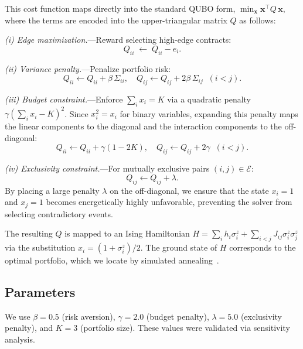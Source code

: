 \documentclass[aps, reprint, prl, twocolumn, superscriptaddress,amsmath,amssymb,noeprint]{revtex4-2}
\begin{document}
This cost function maps directly into the standard QUBO form, $\min_{\mathbf{x}} \mathbf{x}^\top Q \, \mathbf{x}$, where the terms are encoded into the upper-triangular matrix $Q$ as follows:

\textit{(i) Edge maximization.}---Reward selecting high-edge contracts:
\begin{equation}
  Q_{ii} \;\leftarrow\; Q_{ii} - e_i.
\end{equation}

\textit{(ii) Variance penalty.}---Penalize portfolio risk:
\begin{equation}
  Q_{ii} \leftarrow Q_{ii} + \beta\,\Sigma_{ii}, \quad
  Q_{ij} \leftarrow Q_{ij} + 2\beta\,\Sigma_{ij} \;\; (i<j).
\end{equation}

\textit{(iii) Budget constraint.}---Enforce $\sum_i x_i = K$ via a
quadratic penalty $\gamma(\sum_i x_i - K)^2$. Since $x_i^2 = x_i$ for binary variables, expanding this penalty maps the linear components to the diagonal and the interaction components to the off-diagonal:
\begin{equation}
  Q_{ii} \leftarrow Q_{ii} + \gamma(1-2K), \quad
  Q_{ij} \leftarrow Q_{ij} + 2\gamma \;\; (i<j).
\end{equation}

\textit{(iv) Exclusivity constraint.}---For mutually exclusive pairs
$(i,j) \in \mathcal{E}$:
\begin{equation}
  Q_{ij} \leftarrow Q_{ij} + \lambda.
  \label{eq:exclusivity}
\end{equation}
By placing a large penalty $\lambda$ on the off-diagonal, we ensure that the state $x_i = 1$ and $x_j = 1$ becomes energetically highly unfavorable, preventing the solver from selecting contradictory events.

The resulting $Q$ is mapped to an Ising Hamiltonian
$H = \sum_i h_i \sigma_i^z + \sum_{i<j} J_{ij}\sigma_i^z\sigma_j^z$
via the substitution $x_i = (1+\sigma_i^z)/2$.  The ground state of $H$
corresponds to the optimal portfolio, which we locate by simulated
annealing~\cite{kirkpatrick1983}.
\subsection{Parameters}

We use $\beta = 0.5$ (risk aversion), $\gamma = 2.0$ (budget penalty),
$\lambda = 5.0$ (exclusivity penalty), and $K = 3$ (portfolio size).
These values were validated via sensitivity analysis.
\end{document}
